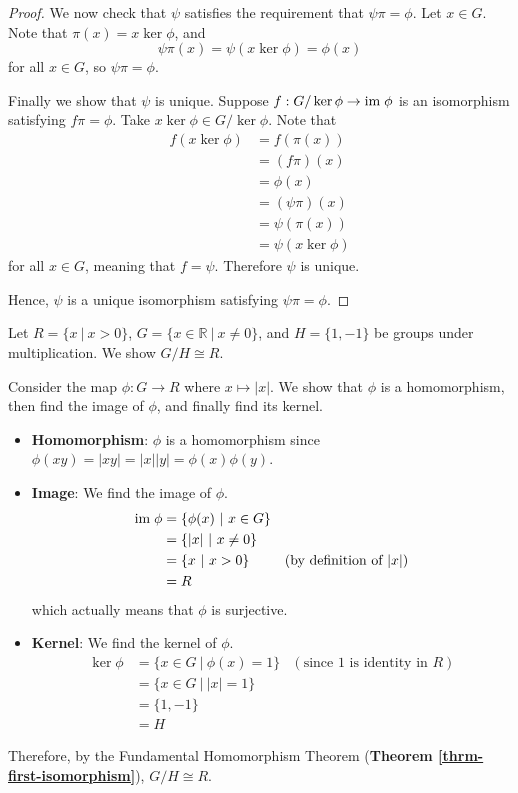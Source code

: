 \begin{proof}
    We now check that $\psi$ satisfies the requirement that $\psi\pi = \phi$. Let $x \in G$. Note that $\pi(x) = x\ker\phi$, and
    \[
        \psi\pi(x) = \psi(x\ker\phi) = \phi(x)
    \]
    for all $x \in G$, so $\psi\pi = \phi$.

    Finally we show that $\psi$ is unique. Suppose $f: G/\ker\phi \to \mathrm{im}\;\phi$ is an isomorphism satisfying $f\pi=\phi$. Take $x\ker\phi \in G/\ker\phi$. Note that
    \begin{align*}
        f(x\ker\phi) &= f(\pi(x))\\
        &= (f\pi)(x)\\
        &= \phi(x)\\
        &= (\psi\pi)(x)\\
        &= \psi(\pi(x))\\
        &= \psi(x\ker\phi)
    \end{align*}
    for all $x \in G$, meaning that $f = \psi$. Therefore $\psi$ is unique.

    Hence, $\psi$ is a unique isomorphism satisfying $\psi\pi = \phi$.
\end{proof}

\begin{example}
    Let $R = \{x \ | \ x > 0\}$, $G = \{x \in \mathbb{R} \ | \ x \neq 0\}$, and $H = \{1, -1\}$ be groups under multiplication. We show $G / H \cong R$.

    Consider the map $\phi: G \to R$ where $x \mapsto |x|$. We show that $\phi$ is a homomorphism, then find the image of $\phi$, and finally find its kernel.
    \begin{itemize}
        \item \textbf{Homomorphism}: $\phi$ is a homomorphism since $\phi(xy) = |xy| = |x||y| = \phi(x)\phi(y)$.
        \item \textbf{Image}: We find the image of $\phi$.
        \begin{align*}
            \mathrm{im}\;\phi &= \{\phi(x) \ | \ x \in G\}\\
            &= \{|x| \ | \ x \neq 0\}\\
            &= \{x \ | \ x > 0\} & (\text{by definition of } |x|)\\
            &= R
        \end{align*}
        which actually means that $\phi$ is surjective.
        \item \textbf{Kernel}: We find the kernel of $\phi$.
        \begin{align*}
            \ker\phi &= \{x \in G \ | \ \phi(x) = 1\} & (\text{since } 1 \text{ is identity in } R)\\
            &= \{x \in G \ | \ |x| = 1\}\\
            &= \{1, -1\}\\
            &= H
        \end{align*}
    \end{itemize}
    Therefore, by the Fundamental Homomorphism Theorem (\textbf{Theorem \ref{thrm-first-isomorphism}}), $G/H \cong R$.
\end{example}

